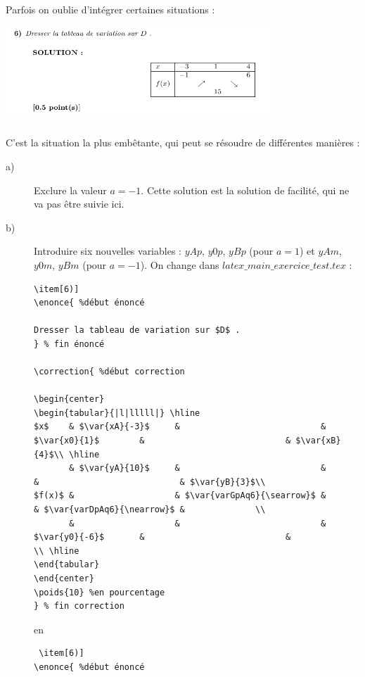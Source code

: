 {\begin{description}
\begin{verbatim}
\end{verbatim}

\item[Variable oublié : ] Parfois on oublie d'intégrer certaines situations : \\
 \includegraphics[width=10cm,height=4cm]{./images/creation_exercice_solve_erreur_03.png}

 C'est la situation la plus embêtante, qui peut se résoudre de différentes manières :
 \begin{description}
  \item[a) ] Exclure la valeur $a=-1$. Cette solution est la solution de facilité, qui ne va pas être suivie ici. 
  \item[b) ] Introduire six nouvelles variables : $yAp$, $y0p$, $yBp$ (pour $a=1$) et $yAm$, $y0m$, $yBm$ (pour $a=-1$). 
  On change dans {\bf $latex\_main\_exercice\_test.tex$} :
  {\small
  \begin{verbatim}
\item[6)] 
\enonce{ %début énoncé 

Dresser la tableau de variation sur $D$ .
} % fin énoncé 

\correction{ %début correction 

\begin{center}
\begin{tabular}{|l|lllll|} \hline
$x$    & $\var{xA}{-3}$     &                            & $\var{x0}{1}$        &                            & $\var{xB}{4}$\\ \hline
       & $\var{yA}{10}$     &                            &                      &                            & $\var{yB}{3}$\\ 
$f(x)$ &                    & $\var{varGpAq6}{\searrow}$ &                      & $\var{varDpAq6}{\nearrow}$ &              \\
       &                    &                            & $\var{y0}{-6}$       &                            &              \\ \hline
\end{tabular}
\end{center}
\poids{10} %en pourcentage
} % fin correction    
  \end{verbatim}
  }
  en 
  {\small
  \begin{verbatim}
 \item[6)] 
\enonce{ %début énoncé 


\end{verbatim}}
\end{description}
\end{description}}
